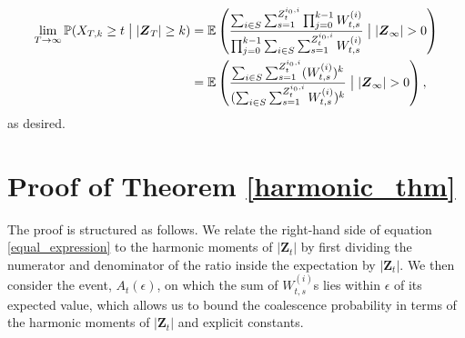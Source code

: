 \documentclass[preprint,3p,12pt]{elsarticle}
\theoremstyle{definition}
\newcommand{\A}[1][]{A_t^{#1}(\epsilon)}
\newcommand{\Z}{\boldsymbol{Z}_{t, T-t, s}^{i}}
\newcommand{\z}[1][i_0, i]{Z_t^{#1}}
\begin{document}
\begin{align*}
    \lim_{T \rightarrow \infty}\mathbb{P}(X_{T,k} \ge t\bigm| |\boldsymbol{Z}_T| \ge k) 
    &= \mathbb{E}\left(\frac{ \sum_{i \in S}\sum_{s=1}^{\z}  \prod_{j=0}^{k-1} W^{(i)}_{t, s}}
    {\prod_{j=0}^{k-1}\sum_{i \in S} \sum_{s=1}^{Z_t^{i_0,i}} W^{(i)}_{t, s}}\bigm| |\boldsymbol{Z}_{\infty}| >0\right) \nonumber\\
    &=\mathbb{E}\left(\frac{ \sum_{i \in S}\sum_{s=1}^{\z}   (W^{(i)}_{t, s})^k}
    {(\sum_{i \in S} \sum_{s=1}^{Z_t^{i_0,i}} W^{(i)}_{t, s})^k}\bigm| |\boldsymbol{Z}_{\infty}| >0\right), %
\end{align*}
as desired.
\section{Proof of Theorem \ref{harmonic_thm}}\label{harmonic_section}

The proof is structured as follows. We relate the right-hand side of equation \eqref{equal_expression} to the harmonic moments of $|\boldsymbol{Z}_t|$ by first dividing the numerator and denominator of the ratio inside the expectation by $|\boldsymbol{Z}_t|$. We then consider the event, $\A$, on which the sum of $W^{(i)}_{t,s}$s lies within $\epsilon$ of its expected value, which allows us to bound the coalescence probability in terms of the harmonic moments of $|\boldsymbol{Z}_t|$ and explicit constants. 
\end{document}
